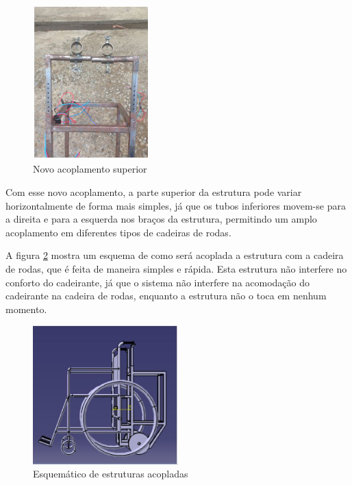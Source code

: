 \begin{figure}[!htb]
\centering
\includegraphics[width=0.4\textwidth]{figuras/resultados/novo_acoplamento_superior}
\caption{Novo acoplamento superior}
\label{fig:novo_acoplamento_superior}
\end{figure}

Com esse novo acoplamento, a parte superior da estrutura pode variar horizontalmente de forma mais simples, já que os tubos inferiores movem-se para a direita e para a esquerda nos braços da estrutura, permitindo um amplo acoplamento em diferentes tipos de cadeiras de rodas.

A figura \ref{fig:esquematico_estr_acoplada} mostra um esquema de como será acoplada a estrutura com a cadeira de rodas, que é feita de maneira simples e rápida. Esta estrutura não interfere no conforto do cadeirante, já que o sistema não interfere na acomodação do cadeirante na cadeira de rodas, enquanto a estrutura não o toca em nenhum momento.

\begin{figure}[!htb]
\centering
\includegraphics[width=0.5\textwidth]{figuras/resultados/esquematico_estr_acoplada}
\caption{Esquemático de estruturas acopladas}
\label{fig:esquematico_estr_acoplada}
\end{figure}

